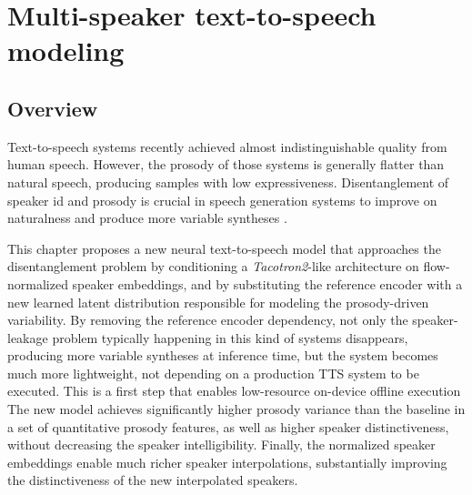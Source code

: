 \chapter{Multi-speaker text-to-speech modeling} \label{ch:tts}
\section{Overview}
Text-to-speech systems recently achieved almost indistinguishable quality from human speech. However, the prosody of those systems is generally flatter than natural speech, producing samples with low expressiveness. Disentanglement of speaker id and prosody is crucial in speech generation systems to improve on naturalness and produce more variable syntheses \autocite{markovi2015}. 

This chapter proposes a new neural text-to-speech model that approaches the disentanglement problem by conditioning a \textit{Tacotron2}-like architecture on flow-normalized speaker embeddings, and by substituting the reference encoder with a new learned latent distribution responsible for modeling the prosody-driven variability. By removing the reference encoder dependency, not only the speaker-leakage problem typically happening in this kind of systems disappears, producing more variable syntheses at inference time, but the system becomes much more lightweight, not depending on a production TTS system to be executed. This is a first step that enables low-resource on-device offline execution The new model achieves significantly higher prosody variance than the baseline in a set of quantitative prosody features, as well as higher speaker distinctiveness, without decreasing the speaker intelligibility. Finally, the normalized speaker embeddings enable much richer speaker interpolations, substantially improving the distinctiveness of the new interpolated speakers.


